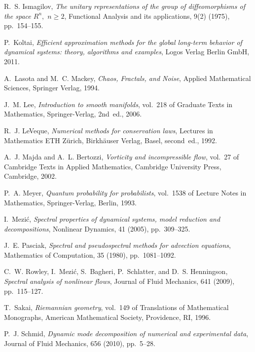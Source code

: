 \documentclass[final,leqno]{siamart}
\begin{document}
\begin{thebibliography}{10}
{\sc R.~S. Ismagilov}, {\em The unitary representations of the group of
  diffeomorphisms of the space {$R^{n},$} {$n\geq 2$}}, Functional Analysis and its applications,
  9(2) (1975), pp.~154--155.

{\sc P.~Koltai}, {\em Efficient approximation methods for the global long-term
  behavior of dynamical systems: theory, algorithms and examples}, Logos Verlag
  Berlin GmbH, 2011.

{\sc A.~Lasota and M.~C. Mackey}, {\em Chaos, Fractals, and Noise}, Applied
  Mathematical Sciences, Springer Verlag, 1994.

{\sc J.~M. Lee}, {\em Introduction to smooth manifolds}, vol.~218 of Graduate
  Texts in Mathematics, Springer-Verlag, 2nd~ed., 2006.

{\sc R.~J. LeVeque}, {\em Numerical methods for conservation laws}, Lectures in
  Mathematics ETH Z\"urich, Birkh\"auser Verlag, Basel, second~ed., 1992.

{\sc A.~J. Majda and A.~L. Bertozzi}, {\em Vorticity and incompressible flow},
  vol.~27 of Cambridge Texts in Applied Mathematics, Cambridge University
  Press, Cambridge, 2002.

{\sc P.~A. Meyer}, {\em Quantum probability for probabilists}, vol.~1538 of
  Lecture Notes in Mathematics, Springer-Verlag, Berlin, 1993.

{\sc I.~Mezi{\'c}}, {\em Spectral properties of dynamical systems, model
  reduction and decompositions}, Nonlinear Dynamics, 41 (2005), pp.~309--325.

{\sc J.~E. Pasciak}, {\em Spectral and pseudospectral methods for advection
  equations}, Mathematics of Computation, 35 (1980), pp.~1081--1092.

{\sc C.~W. Rowley, I.~Mezi{\'c}, S.~Bagheri, P.~Schlatter, and D.~S.
  Henningson}, {\em Spectral analysis of nonlinear flows}, Journal of Fluid
  Mechanics, 641 (2009), pp.~115--127.

{\sc T.~Sakai}, {\em Riemannian geometry}, vol.~149 of Translations of
  Mathematical Monographs, American Mathematical Society, Providence, RI, 1996.

{\sc P.~J. Schmid}, {\em Dynamic mode decomposition of numerical and
  experimental data}, Journal of Fluid Mechanics, 656 (2010), pp.~5--28.


\end{thebibliography}
\end{document}
